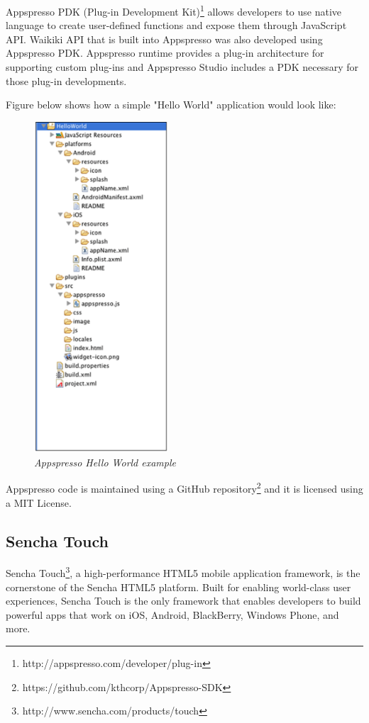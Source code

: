 \documentclass[a4paper,12pt]{book}
\begin{document}
Appspresso PDK (Plug-in Development Kit)\footnote{http://appspresso.com/developer/plug-in}   allows developers to use native language to create user-defined functions and expose them through JavaScript API. Waikiki API that is built into Appspresso was also developed using Appspresso PDK. Appspresso runtime provides a plug-in architecture for supporting custom plug-ins and Appspresso Studio includes a PDK necessary for those plug-in developments.

Figure below shows how a simple "Hello World" application would look like:

\begin{figure}[H]
    \centering
    \includegraphics[width=5cm, keepaspectratio]{img/appspresso.png}
    \caption{\textit{Appspresso Hello World example}}
 \end{figure}
 
Appspresso code is maintained using a GitHub repository\footnote{https://github.com/kthcorp/Appspresso-SDK} and it is licensed using a MIT License.
 
\subsection{Sencha Touch}
\label{Sencha Touch}

Sencha Touch\footnote{http://www.sencha.com/products/touch}, a high-performance HTML5 mobile application framework, is the cornerstone of the Sencha HTML5 platform. Built for enabling world-class user experiences, Sencha Touch is the only framework that enables developers to build powerful apps that work on iOS, Android, BlackBerry, Windows Phone, and more.
\end{document}

